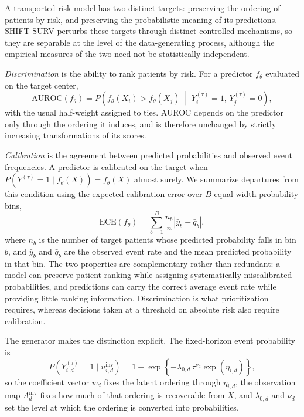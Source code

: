 A transported risk model has two distinct targets: preserving the ordering of
patients by risk, and preserving the probabilistic meaning of its predictions.
SHIFT-SURV perturbs these targets through distinct controlled mechanisms, so
they are separable at the level of the data-generating process, although the
empirical measures of the two need not be statistically independent.

\emph{Discrimination} is the ability to rank patients by risk. For a predictor
$f_\theta$ evaluated on the target center,
\begin{equation}
\mathrm{AUROC}(f_\theta)
=
P\!\left(
f_\theta(X_i) > f_\theta(X_j)
\;\middle|\;
Y_i^{(\tau)}=1,\,
Y_j^{(\tau)}=0
\right),
\end{equation}
with the usual half-weight assigned to ties. AUROC depends on the predictor
only through the ordering it induces, and is therefore unchanged by strictly
increasing transformations of its scores.

\emph{Calibration} is the agreement between predicted probabilities and
observed event frequencies. A predictor is calibrated on the target when
$P(Y^{(\tau)}=1\mid f_\theta(X))=f_\theta(X)$ almost surely. We summarize
departures from this condition using the expected calibration error over $B$
equal-width probability bins,
\begin{equation}
\mathrm{ECE}(f_\theta)
=
\sum_{b=1}^{B}
\frac{n_b}{n}
\left|\bar{y}_b-\bar{q}_b\right|,
\end{equation}
where $n_b$ is the number of target patients whose predicted probability falls
in bin $b$, and $\bar{y}_b$ and $\bar{q}_b$ are the observed event rate and the
mean predicted probability in that bin. The two properties are complementary
rather than redundant: a model can preserve patient ranking while assigning
systematically miscalibrated probabilities, and predictions can carry the
correct average event rate while providing little ranking information.
Discrimination is what prioritization requires, whereas decisions taken at a
threshold on absolute risk also require calibration.

The generator makes the distinction explicit. The fixed-horizon event
probability is
\begin{equation}
P\!\left(Y_{i,d}^{(\tau)}=1 \mid u_{i,d}^{\mathrm{inv}}\right)
=
1-\exp\!\left\{
-\lambda_{0,d}\,\tau^{\nu_d}\exp(\eta_{i,d})
\right\},
\end{equation}
so the coefficient vector $w_d$ fixes the latent ordering through
$\eta_{i,d}$, the observation map $A_d^{\mathrm{inv}}$ fixes how much of that
ordering is recoverable from $X$, and $\lambda_{0,d}$ and $\nu_d$ set the level
at which the ordering is converted into probabilities.

